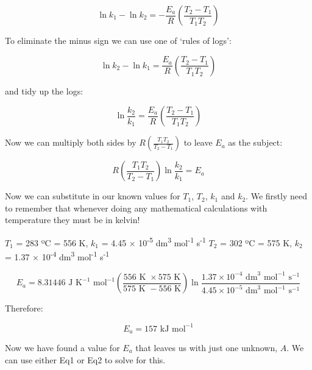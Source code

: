 \documentclass[
]{book}
\begin{document}
\begin{equation*}
\ln {k_1} - \ln {k_2} = -\frac{E_a}{R} \left(\frac{T_2-T_1}{T_1 T_2}  \right)
\end{equation*}

To eliminate the minus sign we can use one of `rules of logs':

\begin{equation*}
\ln {k_2} - \ln {k_1} = \frac{E_a}{R} \left(\frac{T_2-T_1}{T_1 T_2}  \right)
\end{equation*}

and tidy up the logs:

\begin{equation*}
\ln {\frac{k_2}{k_1}} = \frac{E_a}{R} \left(\frac{T_2-T_1}{T_1 T_2}  \right)
\end{equation*}

Now we can multiply both sides by \(R\left(\frac{T_1 T_2}{T_2 - T_1}\right)\) to leave \(E_a\) as the subject:

\begin{equation*}
R\left(\frac{T_1 T_2}{T_2 - T_1}\right)\ln {\frac{k_2}{k_1}} = E_a
\end{equation*}

Now we can substitute in our known values for \(T_1\), \(T_2\), \(k_1\) and \(k_2\). We firstly need to remember that whenever doing any mathematical calculations with temperature they must be in kelvin!

\(T_1\) = 283 ºC = 556 K, \(k_1\) = 4.45 × 10\textsuperscript{-5} dm\textsuperscript{3} mol\textsuperscript{-1} s\textsuperscript{-1}
\(T_2\) = 302 ºC = 575 K, \(k_2\) = 1.37 × 10\textsuperscript{-4} dm\textsuperscript{3} mol\textsuperscript{-1} s\textsuperscript{-1}

\begin{equation*}
E_a = 8.31446 \textrm{ J K}^{-1} \textrm{ mol}^{-1}\left(\frac{556\textrm{ K } \times 575\textrm{ K}}{575\textrm{ K } - 556\textrm{ K}}\right)\ln {\frac{1.37 \times 10^{-4} \textrm{ dm}^3 \textrm{ mol}^{-1} \textrm{ s}^{-1}}{4.45 \times 10^{-5} \textrm{ dm}^3 \textrm{ mol}^{-1} \textrm{ s}^{-1}}}
\end{equation*}

Therefore:

\begin{equation*}
E_a = 157 \textrm{ kJ mol}^{-1}
\end{equation*}

Now we have found a value for \(E_a\) that leaves us with just one unknown, \(A\). We can use either Eq1 or Eq2 to solve for this.
\end{document}
